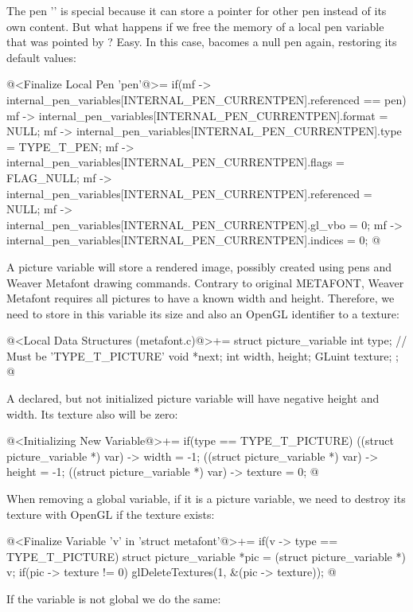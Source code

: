 The pen '' is special because it can store a
pointer for other pen instead of its own content. But what happens if
we free the memory of a local pen variable that was pointed
by ? Easy. In this
case,  bacomes a null pen again, restoring its
default values:

\iniciocodigo
@<Finalize Local Pen 'pen'@>=
if(mf -> internal_pen_variables[INTERNAL_PEN_CURRENTPEN].referenced == pen){
  mf -> internal_pen_variables[INTERNAL_PEN_CURRENTPEN].format = NULL;
  mf -> internal_pen_variables[INTERNAL_PEN_CURRENTPEN].type = TYPE_T_PEN;
  mf -> internal_pen_variables[INTERNAL_PEN_CURRENTPEN].flags = FLAG_NULL;
  mf -> internal_pen_variables[INTERNAL_PEN_CURRENTPEN].referenced = NULL;
  mf -> internal_pen_variables[INTERNAL_PEN_CURRENTPEN].gl_vbo = 0;
  mf -> internal_pen_variables[INTERNAL_PEN_CURRENTPEN].indices = 0;
}
@
\fimcodigo


A picture variable will store a rendered image, possibly created using
pens and Weaver Metafont drawing commands. Contrary to original
METAFONT, Weaver Metafont requires all pictures to have a known width
and height. Therefore, we need to store in this variable its size and
also an OpenGL identifier to a texture:

\iniciocodigo
@<Local Data Structures (metafont.c)@>+=
struct picture_variable{
  int type; // Must be 'TYPE_T_PICTURE'
  void *next;
  int width, height;
  GLuint texture;
};
@
\fimcodigo

A declared, but not initialized picture variable will have negative
height and width. Its texture also will be zero:

\iniciocodigo
@<Initializing New Variable@>+=
if(type == TYPE_T_PICTURE){
  ((struct picture_variable *) var) -> width = -1;
  ((struct picture_variable *) var) -> height = -1;
  ((struct picture_variable *) var) -> texture = 0;
}
@
\fimcodigo

When removing a global variable, if it is a picture variable, we need
to destroy its texture with OpenGL if the texture exists:

\iniciocodigo
@<Finalize Variable 'v' in 'struct metafont'@>+=
if(v -> type == TYPE_T_PICTURE){
  struct picture_variable *pic = (struct picture_variable *) v;
  if(pic -> texture != 0)
    glDeleteTextures(1, &(pic -> texture));
}
@
\fimcodigo

If the variable is not global we do the same:

